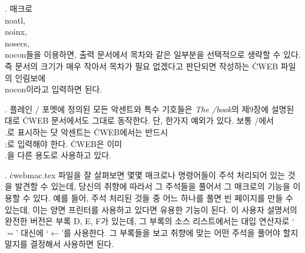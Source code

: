 {%
. 매크로 \.{\\noatl}, \.{\\noinx}, \.{\\nosecs}, \.{\\nocon}들을
이용하면, 출력 문서에서 목차와 같은 일부분을 선택적으로 생략할 수
있다. 즉 문서의 크기가 매우 작아서 목차가 필요 없겠다고 판단되면
작성하는 \.{CWEB} 파일의 인림보에 \.{\\nocon}이라고 입력하면 된다.

. 플레인 \TEX/ 포멧에 정의된 모든 악센트와 특수
기호들은 {\sl The \TEX/book\/}의 제9장에 설명된 대로 \.{CWEB}
문서에서도 그대로 동작한다. 단, 한가지 예외가 있다.
보통 \TEX/에서 \.{\\.}로 표시하는 닷 악센트는 \.{CWEB}에서는 반드시
\.{\\:}로 입력해야 한다. \.{CWEB}은 이미 \.{\\.}을 다른 용도로 사용하고 있다.

. \.{cwebmac.tex} 파일을 잘 살펴보면 몇몇 매크로나
명령어들이 주석 처리되어 있는 것을 발견할 수 있는데, 당신의 취향에
따라서 그 주석들을 풀어서 그 매크로의 기능을 이용할 수 있다. 예를 들어, 주석
처리된 것들 중 어느 하나를 풀면 빈 페이지를 만들 수 있는데, 이는 양면
프린터를 사용하고 있다면 유용한 기능이 된다. 이 사용자 설명서의 완전한
버전은 부록 D, E, F가 있는데, 그 부록의 소스 리스트에서는 대입
연산자로 `$=$' 대신에 `$\gets$'를 사용한다. 그 부록들을 보고 취향에
맞는 어떤 주석을 풀어야 할지 말지를 결정해서 사용하면 된다.

}
